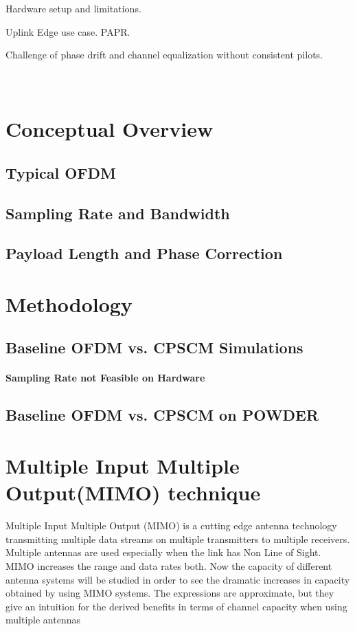 \documentclass[12pt]{report}
\begin{document}
Hardware setup and limitations.

Uplink Edge use case. PAPR.

Challenge of phase drift and channel equalization without consistent pilots.\\\\\\

\section*{Conceptual Overview}
\subsection{Typical OFDM}
\subsection{Sampling Rate and Bandwidth}
\subsection{Payload Length and Phase Correction}
\section*{Methodology}

\subsection*{Baseline OFDM vs. CPSCM Simulations}
\paragraph*{Sampling Rate not Feasible on Hardware}

\subsection*{Baseline OFDM vs. CPSCM on POWDER}

\section*{Multiple Input Multiple Output(MIMO) technique}
Multiple Input Multiple Output (MIMO) is a cutting edge antenna
technology transmitting multiple data streams on multiple transmitters
to multiple receivers. Multiple antennas are used especially when
the link has Non Line of Sight. MIMO increases the range and data
rates both.
Now the capacity of different antenna systems will be studied in order
to see the dramatic increases in capacity obtained by using MIMO systems. The expressions are approximate, but they give an intuition for
the derived benefits in terms of channel capacity when using multiple
antennas
\end{document}
